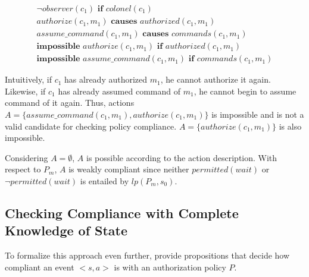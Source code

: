 \begin{gather}
    \neg observer(c_1) \textbf{ if } colonel(c_1) \label{eq:apl_action_description_5} \\
    authorize(c_1, m_1) \textbf{ causes } authorized(c_1, m_1) \label{eq:apl_action_description_1} \\
    assume\_command(c_1, m_1) \textbf{ causes } commands(c_1, m_1) \label{eq:apl_action_description_2} \\
    \textbf{impossible } authorize(c_1, m_1) \textbf{ if } authorized(c_1, m_1) \label{eq:apl_action_description_3} \\
    \textbf{impossible } assume\_command(c_1, m_1) \textbf{ if } commands(c_1, m_1) \label{eq:apl_action_description_4}
\end{gather}

Intuitively, if $c_1$ has already authorized $m_1$, he cannot authorize it again.
Likewise, if $c_1$ has already assumed command of $m_1$, he cannot begin to assume command of it again.
Thus, actions $A = \{assume\_command(c_1, m_1), authorize(c_1, m_1)\}$ is impossible and is not a valid candidate for checking policy compliance.
$A = \{authorize(c_1, m_1)\}$ is also impossible.

Considering $A=\emptyset$, $A$ is possible according to the action description.
With respect to $P_m$, $A$ is weakly compliant since neither $permitted(wait)$ or $\neg permitted(wait)$ is entailed by $lp(P_m, s_0)$.

\subsection{Checking Compliance with Complete Knowledge of State}

To formalize this approach even further, \citet{gelfond_authorization_2008} provide propositions that decide how compliant an event $<s,a>$ is with an authorization policy $P$.


